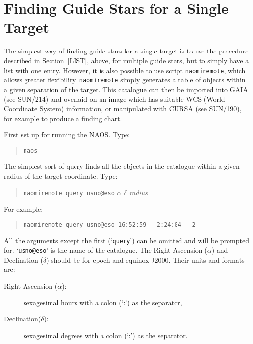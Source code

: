 \documentclass[twoside,11pt]{article}
\newcommand{\xref}[3]{#1}
\newcommand{\xlabel}[1]{}
\renewcommand{\_}{\texttt{\symbol{95}}}
\begin{document}
\newpage
\section{\xlabel{SINGLE}\label{SINGLE}Finding Guide Stars for a Single Target}

The simplest way of finding guide stars for a single target is to use
the procedure described in Section~\ref{LIST}, above, for multiple
guide stars, but to simply have a list with one entry.  However, it is also
possible to use script {\tt naomiremote}, which allows greater flexibility.
{\tt naomiremote} simply generates a table of objects within a given
separation of the target.  This catalogue can then be imported into GAIA
(see \xref{SUN/214}{sun214}{}\cite{SUN214}) and overlaid on an image which
has suitable WCS (World Coordinate System) information, or manipulated with
CURSA (see \xref{SUN/190}{sun190}{}\cite{SUN190}), for example to produce a
finding chart.

First set up for running the NAOS.  Type:

\begin{quote}
{\tt naos}
\end{quote}

The simplest sort of query finds all the objects in the catalogue
within a given radius of the target coordinate.  Type:

\begin{quote}
{\tt naomiremote query usno@eso} {\it $\alpha$ $\delta$ radius}
\end{quote}

For example:

\begin{quote}
{\tt naomiremote query usno@eso 16:52:59 ~ 2:24:04 ~ 2}
\end{quote}

All the arguments except the first (`{\tt query}') can be omitted and will
be prompted for.  `{\tt usno@eso}' is the name of the catalogue.  The
Right Ascension ($\alpha$) and Declination ($\delta$) should be for epoch and equinox J2000.
Their units and formats are:

\begin{description}

  \item[{\rm Right Ascension ($\alpha$):}] sexagesimal hours with a colon
   (`:') as the separator,

  \item[{\rm Declination($\delta$):}] sexagesimal degrees with a colon (`:')
   as the separator.

\end{description}
\end{document}
